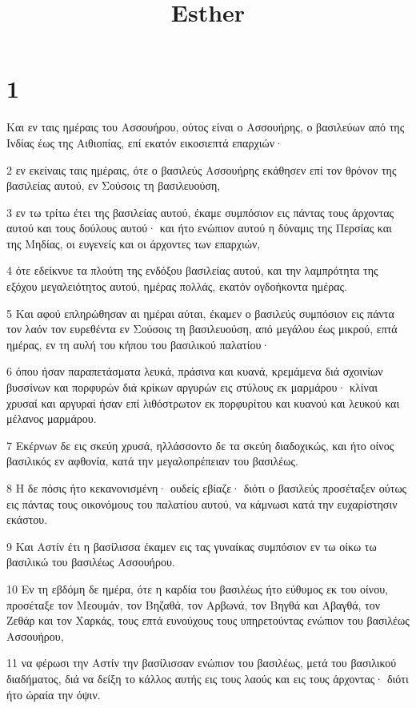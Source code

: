 

\title{Esther}


\chapter{1}

\par Και εν ταις ημέραις του Ασσουήρου, ούτος είναι ο Ασσουήρης, ο βασιλεύων από της Ινδίας έως της Αιθιοπίας, επί εκατόν εικοσιεπτά επαρχιών·
\par 2 εν εκείναις ταις ημέραις, ότε ο βασιλεύς Ασσουήρης εκάθησεν επί τον θρόνον της βασιλείας αυτού, εν Σούσοις τη βασιλευούση,
\par 3 εν τω τρίτω έτει της βασιλείας αυτού, έκαμε συμπόσιον εις πάντας τους άρχοντας αυτού και τους δούλους αυτού· και ήτο ενώπιον αυτού η δύναμις της Περσίας και της Μηδίας, οι ευγενείς και οι άρχοντες των επαρχιών,
\par 4 ότε εδείκνυε τα πλούτη της ενδόξου βασιλείας αυτού, και την λαμπρότητα της εξόχου μεγαλειότητος αυτού, ημέρας πολλάς, εκατόν ογδοήκοντα ημέρας.
\par 5 Και αφού επληρώθησαν αι ημέραι αύται, έκαμεν ο βασιλεύς συμπόσιον εις πάντα τον λαόν τον ευρεθέντα εν Σούσοις τη βασιλευούση, από μεγάλου έως μικρού, επτά ημέρας, εν τη αυλή του κήπου του βασιλικού παλατίου·
\par 6 όπου ήσαν παραπετάσματα λευκά, πράσινα και κυανά, κρεμάμενα διά σχοινίων βυσσίνων και πορφυρών διά κρίκων αργυρών εις στύλους εκ μαρμάρου· κλίναι χρυσαί και αργυραί ήσαν επί λιθόστρωτον εκ πορφυρίτου και κυανού και λευκού και μέλανος μαρμάρου.
\par 7 Εκέρνων δε εις σκεύη χρυσά, ηλλάσσοντο δε τα σκεύη διαδοχικώς, και ήτο οίνος βασιλικός εν αφθονία, κατά την μεγαλοπρέπειαν του βασιλέως.
\par 8 Η δε πόσις ήτο κεκανονισμένη· ουδείς εβίαζε· διότι ο βασιλεύς προσέταξεν ούτως εις πάντας τους οικονόμους του παλατίου αυτού, να κάμνωσι κατά την ευχαρίστησιν εκάστου.
\par 9 Και Αστίν έτι η βασίλισσα έκαμεν εις τας γυναίκας συμπόσιον εν τω οίκω τω βασιλικώ του βασιλέως Ασσουήρου.
\par 10 Εν τη εβδόμη δε ημέρα, ότε η καρδία του βασιλέως ήτο εύθυμος εκ του οίνου, προσέταξε τον Μεουμάν, τον Βηζαθά, τον Αρβωνά, τον Βηγθά και Αβαγθά, τον Ζεθάρ και τον Χαρκάς, τους επτά ευνούχους τους υπηρετούντας ενώπιον του βασιλέως Ασσουήρου,
\par 11 να φέρωσι την Αστίν την βασίλισσαν ενώπιον του βασιλέως, μετά του βασιλικού διαδήματος, διά να δείξη το κάλλος αυτής εις τους λαούς και εις τους άρχοντας· διότι ήτο ώραία την όψιν.
